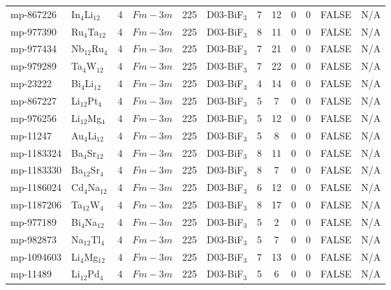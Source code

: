 {\begin{longtable}{llcccccccccc}
    mp-867226 & In$_{4}$Li$_{12}$ & 4     & $Fm-3m$ & 225   & D03-BiF$_{3}$ & 7     & 12    & 0     & 0     & FALSE & N/A \\
    mp-977390 & Ru$_{4}$Ta$_{12}$ & 4     & $Fm-3m$ & 225   & D03-BiF$_{3}$ & 8     & 11    & 0     & 0     & FALSE & N/A \\
    mp-977434 & Nb$_{12}$Ru$_{4}$ & 4     & $Fm-3m$ & 225   & D03-BiF$_{3}$ & 7     & 21    & 0     & 0     & FALSE & N/A \\
    mp-979289 & Ta$_{4}$W$_{12}$ & 4     & $Fm-3m$ & 225   & D03-BiF$_{3}$ & 7     & 22    & 0     & 0     & FALSE & N/A \\
    mp-23222 & Bi$_{4}$Li$_{12}$ & 4     & $Fm-3m$ & 225   & D03-BiF$_{3}$ & 4     & 14    & 0     & 0     & FALSE & N/A \\
    mp-867227 & Li$_{12}$Pt$_{4}$ & 4     & $Fm-3m$ & 225   & D03-BiF$_{3}$ & 5     & 7     & 0     & 0     & FALSE & N/A \\
    mp-976256 & Li$_{12}$Mg$_{4}$ & 4     & $Fm-3m$ & 225   & D03-BiF$_{3}$ & 5     & 12    & 0     & 0     & FALSE & N/A \\
    mp-11247 & Au$_{4}$Li$_{12}$ & 4     & $Fm-3m$ & 225   & D03-BiF$_{3}$ & 5     & 8     & 0     & 0     & FALSE & N/A \\
    mp-1183324 & Ba$_{4}$Sr$_{12}$ & 4     & $Fm-3m$ & 225   & D03-BiF$_{3}$ & 8     & 11    & 0     & 0     & FALSE & N/A \\
    mp-1183330 & Ba$_{12}$Sr$_{4}$ & 4     & $Fm-3m$ & 225   & D03-BiF$_{3}$ & 8     & 7     & 0     & 0     & FALSE & N/A \\
    mp-1186024 & Cd$_{4}$Na$_{12}$ & 4     & $Fm-3m$ & 225   & D03-BiF$_{3}$ & 6     & 12    & 0     & 0     & FALSE & N/A \\
    mp-1187206 & Ta$_{12}$W$_{4}$ & 4     & $Fm-3m$ & 225   & D03-BiF$_{3}$ & 8     & 17    & 0     & 0     & FALSE & N/A \\
    mp-977189 & Bi$_{4}$Na$_{12}$ & 4     & $Fm-3m$ & 225   & D03-BiF$_{3}$ & 5     & 2     & 0     & 0     & FALSE & N/A \\
    mp-982873 & Na$_{12}$Tl$_{4}$ & 4     & $Fm-3m$ & 225   & D03-BiF$_{3}$ & 5     & 7     & 0     & 0     & FALSE & N/A \\
    mp-1094603 & Li$_{4}$Mg$_{12}$ & 4     & $Fm-3m$ & 225   & D03-BiF$_{3}$ & 7     & 13    & 0     & 0     & FALSE & N/A \\
    mp-11489 & Li$_{12}$Pd$_{4}$ & 4     & $Fm-3m$ & 225   & D03-BiF$_{3}$ & 5     & 6     & 0     & 0     & FALSE & N/A \\

\end{longtable}}
